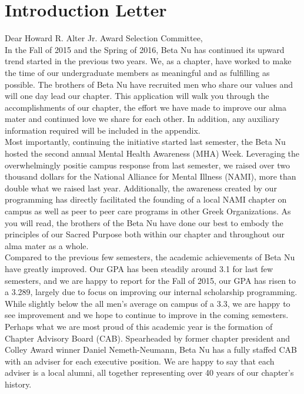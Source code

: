 \chapter{Introduction Letter}

Dear Howard R. Alter Jr. Award Selection Committee, \\

In the Fall of 2015 and the Spring of 2016, Beta Nu has continued its upward trend started in the previous two years. We, as a chapter, have worked to make the time of our undergraduate members as meaningful and as fulfilling as possible.  The brothers of Beta Nu have recruited men who share our values and will one day lead our chapter. This application will walk you through the accomplishments of our chapter, the effort we have made to improve our alma mater and continued love we share for each other. In addition, any auxiliary information required will be included in the appendix. \\

Most importantly, continuing the initiative started last semester, the Beta Nu hosted the second annual Mental Health Awareness (MHA) Week. Leveraging the overwhelmingly positie campus response from last semester, we raised over two thousand dollars for the National Alliance for Mental Illness (NAMI), more than double what we raised last year. Additionally, the awareness created by our programming has directly facilitated the founding of a local NAMI chapter on campus as well as peer to peer care programs in other Greek Organizations. As you will read, the brothers of the Beta Nu have done our best to embody the principles of our Sacred Purpose both within our chapter and throughout our alma mater as a whole. \\

Compared to the previous few semesters, the academic achievements of Beta Nu have greatly improved. Our GPA has been steadily around 3.1 for last few semesters, and we are happy to report for the Fall of 2015, our GPA has risen to a 3.289, largely due to focus on improving our internal scholarship programming. While slightly below the all men’s average on campus of a 3.3, we are happy to see improvement and we hope to continue to improve in the coming semesters. \\

Perhaps what we are most proud of this academic year is the formation of Chapter Advisory Board (CAB). Spearheaded by former chapter president and Colley Award winner Daniel Nemeth-Neumann, Beta Nu has a fully staffed CAB with an adviser for each executive position. We are happy to say that each adviser is a local alumni, all together representing over 40 years of our chapter’s history. \\

